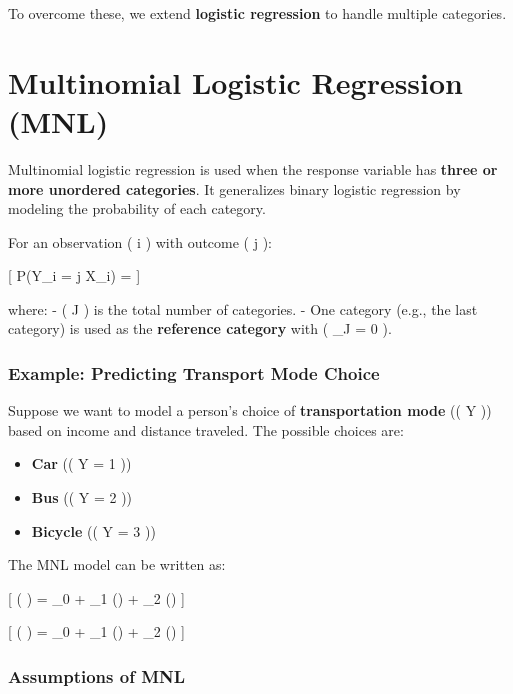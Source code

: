 \documentclass[
  letterpaper,
  DIV=11,
  numbers=noendperiod]{scrartcl}
\providecommand{\tightlist}{%
  \setlength{\itemsep}{0pt}\setlength{\parskip}{0pt}}\usepackage{longtable,booktabs,array}
\begin{document}
To overcome these, we extend \textbf{logistic regression} to handle
multiple categories.

\section{Multinomial Logistic Regression
(MNL)}\label{multinomial-logistic-regression-mnl}

Multinomial logistic regression is used when the response variable has
\textbf{three or more unordered categories}. It generalizes binary
logistic regression by modeling the probability of each category.

For an observation ( i ) with outcome ( j ):

{[} P(Y\_i = j \textbar{} X\_i) =
 {]}

where: - ( J ) is the total number of categories. - One category (e.g.,
the last category) is used as the \textbf{reference category} with (
\beta\_J = 0 ).

\subsubsection{Example: Predicting Transport Mode
Choice}\label{example-predicting-transport-mode-choice}

Suppose we want to model a person's choice of \textbf{transportation
mode} (( Y )) based on income and distance traveled. The possible
choices are:

\begin{itemize}
\tightlist
\item
  \textbf{Car} (( Y = 1 ))
\item
  \textbf{Bus} (( Y = 2 ))
\item
  \textbf{Bicycle} (( Y = 3 ))
\end{itemize}

The MNL model can be written as:

{[} \log \left(  \right) =
\beta\_0 + \beta\_1 () + \beta\_2 () {]}

{[} \log \left(  \right)
= \gamma\_0 + \gamma\_1 () + \gamma\_2 ()
{]}

\subsubsection{Assumptions of MNL}\label{assumptions-of-mnl}
\end{document}
